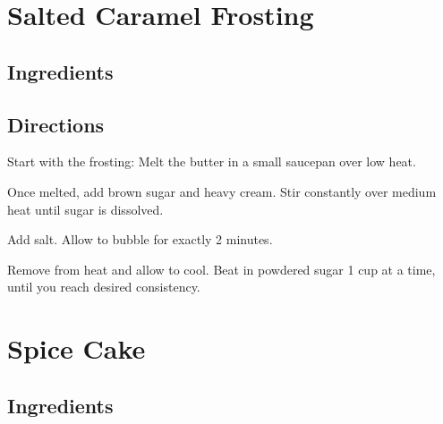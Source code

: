 \documentclass[letterpaper,10pt,english]{sphinxmanual}
\begin{document}
\chapter{Salted Caramel Frosting}
\label{\detokenize{Salted_Caramel_Frosting:salted-caramel-frosting}}\label{\detokenize{Salted_Caramel_Frosting::doc}}

\section{Ingredients}
\label{\detokenize{Salted_Caramel_Frosting:ingredients}}
%
\begin{sphinxVerbatim}[commandchars=\\\{\}]
   

     

   

  

    
\end{sphinxVerbatim}


\section{Directions}
\label{\detokenize{Salted_Caramel_Frosting:directions}}
Start with the frosting: Melt the butter in a small saucepan over low heat.

Once melted, add brown sugar and heavy cream. Stir constantly over medium heat until sugar is dissolved.

Add salt. Allow to bubble for exactly 2 minutes.

Remove from heat and allow to cool. Beat in powdered sugar 1 cup at a time, until you reach desired consistency.


\chapter{Spice Cake}
\label{\detokenize{spice_cake:spice-cake}}\label{\detokenize{spice_cake::doc}}

\section{Ingredients}
\label{\detokenize{spice_cake:ingredients}}
%
\begin{sphinxVerbatim}[commandchars=\\\{\}]
   
    
  
  
 
  
  
\end{sphinxVerbatim}
\end{document}
